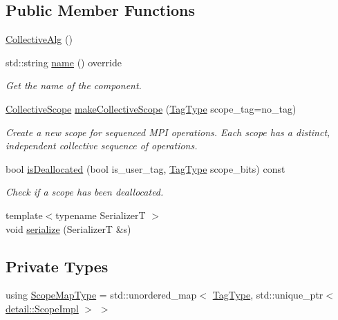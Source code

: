 \subsection*{Public Member Functions}
\begin{DoxyCompactItemize}
\item 
\hyperlink{structvt_1_1collective_1_1_collective_alg_aa137479fb6afcfa33e73592ea3cbbcd8}{Collective\+Alg} ()
\item 
std\+::string \hyperlink{structvt_1_1collective_1_1_collective_alg_a81788afa34bc094c9f71fef8681aefb3}{name} () override
\begin{DoxyCompactList}\small\item\em Get the name of the component. \end{DoxyCompactList}\item 
\hyperlink{structvt_1_1collective_1_1_collective_scope}{Collective\+Scope} \hyperlink{structvt_1_1collective_1_1_collective_alg_a6f2b4c832a5cc11cb7dfc238ecd48edf}{make\+Collective\+Scope} (\hyperlink{namespacevt_a84ab281dae04a52a4b243d6bf62d0e52}{Tag\+Type} scope\+\_\+tag=no\+\_\+tag)
\begin{DoxyCompactList}\small\item\em Create a new scope for sequenced M\+PI operations. Each scope has a distinct, independent collective sequence of operations. \end{DoxyCompactList}\item 
bool \hyperlink{structvt_1_1collective_1_1_collective_alg_ae57f4f34b34540d652c15f5dffeae54c}{is\+Deallocated} (bool is\+\_\+user\+\_\+tag, \hyperlink{namespacevt_a84ab281dae04a52a4b243d6bf62d0e52}{Tag\+Type} scope\+\_\+bits) const
\begin{DoxyCompactList}\small\item\em Check if a scope has been deallocated. \end{DoxyCompactList}\item 
{\footnotesize template$<$typename SerializerT $>$ }\\void \hyperlink{structvt_1_1collective_1_1_collective_alg_a6b1e5e821093eb7fb312c440e90c14ae}{serialize} (SerializerT \&s)
\end{DoxyCompactItemize}
\subsection*{Private Types}
\begin{DoxyCompactItemize}
\item 
using \hyperlink{structvt_1_1collective_1_1_collective_alg_abf644b20fe35cf654f5d4a6702ef5183}{Scope\+Map\+Type} = std\+::unordered\+\_\+map$<$ \hyperlink{namespacevt_a84ab281dae04a52a4b243d6bf62d0e52}{Tag\+Type}, std\+::unique\+\_\+ptr$<$ \hyperlink{structvt_1_1collective_1_1detail_1_1_scope_impl}{detail\+::\+Scope\+Impl} $>$ $>$
\end{DoxyCompactItemize}

